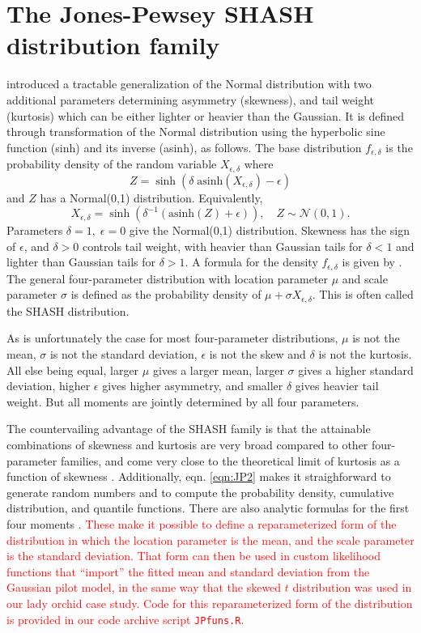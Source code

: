 \documentclass[12pt]{article}
\newcounter{box}
\newcommand{\new}{\textcolor{red}}
\newcommand{\be}{\begin{equation}}
\newcommand{\ee}{\end{equation}}
\begin{document}
\section{The Jones-Pewsey SHASH distribution family} 
\label{sec:SHASHdist} 
\citet{jones-pewsey-2009} introduced a tractable generalization of the Normal distribution with two additional parameters determining  
asymmetry (skewness), and tail weight (kurtosis) which can be either lighter or heavier than the Gaussian. It is defined through transformation of the
Normal distribution using the hyperbolic sine function (sinh) and its inverse (asinh), as follows. The base distribution $f_{\epsilon,\delta}$  is the 
probability density of the random variable $X_{\epsilon,\delta}$ where  
\be
Z = \sinh (\delta \; \mbox{asinh}(X_{\epsilon,\delta}) - \epsilon)
\label{eqn:JP1}
\ee
and $Z$ has a Normal(0,1) distribution. Equivalently, 
\be
X_{\epsilon,\delta} = \sinh \left( \delta^{-1} (\mbox{asinh}(Z) + \epsilon)\right), \quad Z \sim \mathcal{N}(0,1).
\label{eqn:JP2}
\ee
Parameters $\delta=1, \; \epsilon=0$ give the Normal(0,1) distribution. Skewness has the sign of $\epsilon$, and
$\delta > 0$ controls tail weight, with heavier than Gaussian tails for $\delta<1$ and lighter than Gaussian tails for $\delta > 1$. 
A formula for the density $f_{\epsilon,\delta}$ is given by \citet[][eqn. 2]{jones-pewsey-2009}. 
The general four-parameter distribution with location parameter $\mu$ and scale parameter $\sigma$ is defined as the probability density 
of $\mu + \sigma X_{\epsilon, \delta}$. This is often called the SHASH distribution. 

As is unfortunately the case for most four-parameter distributions, $\mu$ is not the mean, $\sigma$ is not the standard deviation, $\epsilon$ is not
the skew and $\delta$ is not the kurtosis. All else being equal, larger $\mu$ gives a larger mean, larger $\sigma$ gives a higher
standard deviation, higher $\epsilon$ gives higher asymmetry, and smaller $\delta$ gives heavier tail weight. 
But all moments are jointly determined by all four parameters. 

The countervailing advantage of the SHASH family is that the attainable combinations of skewness and kurtosis are very broad compared to other 
four-parameter families, and come very close to the theoretical limit of kurtosis as a function of skewness \citep[][Fig.  2]{jones-pewsey-2009}. 
Additionally, eqn. \eqref{eqn:JP2} makes it straighforward to generate random numbers and to compute 
the probability density, cumulative distribution, and quantile functions. There are also analytic formulas for the first four moments
\citep[][p. 764]{jones-pewsey-2009}. \new{These make it possible to define a reparameterized form of the distribution in which the
location parameter is the mean, and the scale parameter is the standard deviation. That form can then be used in
custom likelihood functions that ``import'' the fitted mean and standard deviation from the Gaussian pilot model, 
in the same way that the skewed $t$ distribution was used in our lady orchid case study. 
Code for this reparameterized form of the distribution is provided in our code archive script \texttt{JPfuns.R}.}  
\end{document}
